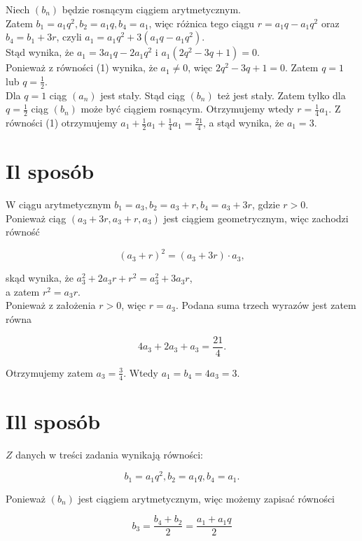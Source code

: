 \documentclass[10pt]{article}
\begin{document}
Niech $\left(b_{n}\right)$ będzie rosnącym ciągiem arytmetycznym.\\
Zatem $b_{1}=a_{1} q^{2}, b_{2}=a_{1} q, b_{4}=a_{1}$, więc różnica tego ciągu $r=a_{1} q-a_{1} q^{2}$ oraz $b_{4}=b_{1}+3 r$, czyli $a_{1}=a_{1} q^{2}+3\left(a_{1} q-a_{1} q^{2}\right)$.\\
Stąd wynika, że $a_{1}=3 a_{1} q-2 a_{1} q^{2}$ i $a_{1}\left(2 q^{2}-3 q+1\right)=0$.\\
Ponieważ z równości (1) wynika, że $a_{1} \neq 0$, więc $2 q^{2}-3 q+1=0$. Zatem $q=1$ lub $q=\frac{1}{2}$.\\
Dla $q=1$ ciąg $\left(a_{n}\right)$ jest stały. Stąd ciąg $\left(b_{n}\right)$ też jest stały. Zatem tylko dla $q=\frac{1}{2}$ ciąg $\left(b_{n}\right)$ może być ciągiem rosnącym. Otrzymujemy wtedy $r=\frac{1}{4} a_{1}$. Z równości (1) otrzymujemy $a_{1}+\frac{1}{2} a_{1}+\frac{1}{4} a_{1}=\frac{21}{4}$, a stąd wynika, że $a_{1}=3$.

\section*{Il sposób}
W ciągu arytmetycznym $b_{1}=a_{3}, b_{2}=a_{3}+r, b_{4}=a_{3}+3 r$, gdzie $r>0$.\\
Ponieważ ciąg $\left(a_{3}+3 r, a_{3}+r, a_{3}\right)$ jest ciągiem geometrycznym, więc zachodzi równość

$$
\left(a_{3}+r\right)^{2}=\left(a_{3}+3 r\right) \cdot a_{3},
$$

skąd wynika, że $a_{3}^{2}+2 a_{3} r+r^{2}=a_{3}^{2}+3 a_{3} r$,\\
a zatem $r^{2}=a_{3} r$.\\
Ponieważ z założenia $r>0$, więc $r=a_{3}$. Podana suma trzech wyrazów jest zatem równa

$$
4 a_{3}+2 a_{3}+a_{3}=\frac{21}{4} .
$$

Otrzymujemy zatem $a_{3}=\frac{3}{4}$. Wtedy $a_{1}=b_{4}=4 a_{3}=3$.

\section*{Ill sposób}
$Z$ danych w treści zadania wynikają równości:

$$
b_{1}=a_{1} q^{2}, b_{2}=a_{1} q, b_{4}=a_{1} .
$$

Ponieważ $\left(b_{n}\right)$ jest ciągiem arytmetycznym, więc możemy zapisać równości

$$
b_{3}=\frac{b_{4}+b_{2}}{2}=\frac{a_{1}+a_{1} q}{2}
$$
\end{document}
